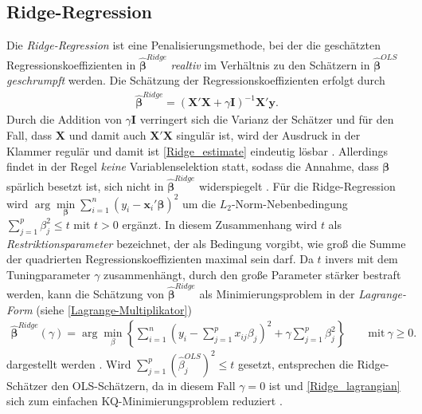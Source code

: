 \documentclass[12pt, a4paper]{report}\usepackage[]{graphicx}\usepackage[]{color}
\begin{document}
\subsection{Ridge-Regression}\label{Kap_Ridge-Regression}
Die \textit{Ridge-Regression} ist eine Penalisierungsmethode, bei der die geschätzten Regressionskoeffizienten in $\boldsymbol{\hat{\beta}}^{Ridge}$ \textit{realtiv} im Verhältnis zu den Schätzern in $\boldsymbol{\hat{\beta}}^{OLS}$ \textit{geschrumpft} werden. Die Schätzung der Regressionskoeffizienten erfolgt durch
\begin{align}\label{Ridge_estimate}
\boldsymbol{\hat{\beta}}^{Ridge} = (\mathbf{X}'\mathbf{X} + \gamma \mathbf{I})^{-1}\mathbf{X}'\mathbf{y}.
\end{align}
Durch die Addition von $\gamma \mathbf{I}$ verringert sich die Varianz der Schätzer und für den Fall, dass $\mathbf{X}$ und damit auch $\mathbf{X}'\mathbf{X}$ singulär ist, wird der Ausdruck in der Klammer regulär und damit ist \eqref{Ridge_estimate} eindeutig lösbar \cite{montgomery2012introduction}.
Allerdings findet in der Regel \textit{keine} Variablenselektion statt, sodass die Annahme, dass $\boldsymbol{\beta}$ spärlich besetzt ist, sich nicht in $\boldsymbol{\hat{\beta}}^{Ridge}$ widerspiegelt \cite{tibshirani96regression}. Für die Ridge-Regression wird $\arg\min\limits_{\boldsymbol{\beta}} \sum_{i=1}^{n} (y_i - \mathbf{x}_i' \boldsymbol{\beta})^2$ um die $L_2$-Norm-Nebenbedingung $\sum_{j=1}^{p}\beta_j^2 \le t$ mit $t > 0$ ergänzt. In diesem Zusammenhang wird $t$ als \textit{Restriktionsparameter} bezeichnet, der als Bedingung vorgibt, wie groß die Summe der quadrierten Regressionskoeffizienten maximal sein darf. Da $t$ invers mit dem Tuningparameter $\gamma$ zusammenhängt, durch den große Parameter stärker bestraft werden, kann die Schätzung von $\boldsymbol{\hat{\beta}}^{Ridge}$ als Minimierungsproblem in der \textit{Lagrange-Form} (siehe \ref{Lagrange-Multiplikator})
\begin{align}\label{Ridge_lagrangian}
\boldsymbol{\hat{\beta}}^{Ridge}(\gamma)=\arg \displaystyle\min_{\beta} \left\lbrace \sum_{i=1}^{n} (y_i - \sum_{j=1}^{p} x_{ij} \beta_j )^2  + \gamma \sum_{j=1}^{p}\beta_j^2 \right\rbrace \qquad \text{mit} \ \gamma \ge 0.
\end{align}
dargestellt werden \cite{hastie2009elements}.
Wird $\sum_{j=1}^{p} (\hat{\beta}_j^{OLS})^2 \le t$ gesetzt, entsprechen die Ridge-Schätzer den OLS-Schätzern, da in diesem Fall $\gamma=0$ ist und \eqref{Ridge_lagrangian} sich zum einfachen KQ-Minimierungsproblem reduziert \cite{tibshirani96regression}.\\
\end{document}
